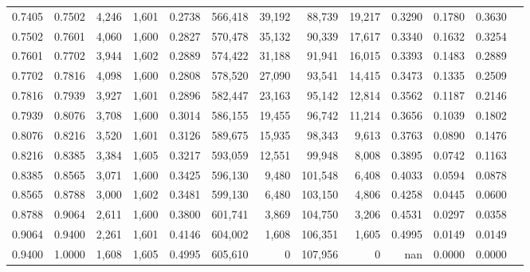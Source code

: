\begin{tabular}{rrrrrrrrrrrrr}
0.7405 & 0.7502 &  4,246 & 1,601 &                                     0.2738 & 566,418 &  39,192 &  88,739 &  19,217 & 0.3290 & 0.1780 & 0.3630 \\
0.7502 & 0.7601 &  4,060 & 1,600 &                                     0.2827 & 570,478 &  35,132 &  90,339 &  17,617 & 0.3340 & 0.1632 & 0.3254 \\
0.7601 & 0.7702 &  3,944 & 1,602 &                                     0.2889 & 574,422 &  31,188 &  91,941 &  16,015 & 0.3393 & 0.1483 & 0.2889 \\
0.7702 & 0.7816 &  4,098 & 1,600 &                                     0.2808 & 578,520 &  27,090 &  93,541 &  14,415 & 0.3473 & 0.1335 & 0.2509 \\
0.7816 & 0.7939 &  3,927 & 1,601 &                                     0.2896 & 582,447 &  23,163 &  95,142 &  12,814 & 0.3562 & 0.1187 & 0.2146 \\
0.7939 & 0.8076 &  3,708 & 1,600 &                                     0.3014 & 586,155 &  19,455 &  96,742 &  11,214 & 0.3656 & 0.1039 & 0.1802 \\
0.8076 & 0.8216 &  3,520 & 1,601 &                                     0.3126 & 589,675 &  15,935 &  98,343 &   9,613 & 0.3763 & 0.0890 & 0.1476 \\
0.8216 & 0.8385 &  3,384 & 1,605 &                                     0.3217 & 593,059 &  12,551 &  99,948 &   8,008 & 0.3895 & 0.0742 & 0.1163 \\
0.8385 & 0.8565 &  3,071 & 1,600 &                                     0.3425 & 596,130 &   9,480 & 101,548 &   6,408 & 0.4033 & 0.0594 & 0.0878 \\
0.8565 & 0.8788 &  3,000 & 1,602 &                                     0.3481 & 599,130 &   6,480 & 103,150 &   4,806 & 0.4258 & 0.0445 & 0.0600 \\
0.8788 & 0.9064 &  2,611 & 1,600 &                                     0.3800 & 601,741 &   3,869 & 104,750 &   3,206 & 0.4531 & 0.0297 & 0.0358 \\
0.9064 & 0.9400 &  2,261 & 1,601 &                                     0.4146 & 604,002 &   1,608 & 106,351 &   1,605 & 0.4995 & 0.0149 & 0.0149 \\
0.9400 & 1.0000 &  1,608 & 1,605 &                                     0.4995 & 605,610 &       0 & 107,956 &       0 &    nan & 0.0000 & 0.0000 \\
\bottomrule
\end{tabular}

